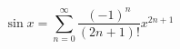 \documentclass{jlreq}
\begin{document}
\[
\sin x = \sum_{n=0}^{\infty} \frac{(-1)^n}{(2n+1)!} x^{2n+1}
\]
\end{document}
